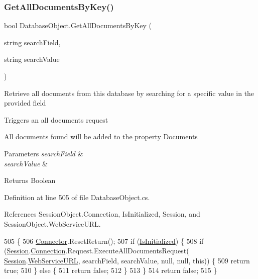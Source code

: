 \subsubsection{\texorpdfstring{Get\+All\+Documents\+By\+Key()}{GetAllDocumentsByKey()}}
{\footnotesize\ttfamily bool Database\+Object.\+Get\+All\+Documents\+By\+Key (\begin{DoxyParamCaption}\item[{string}]{search\+Field,  }\item[{string}]{search\+Value }\end{DoxyParamCaption})}



Retrieve all documents from this database by searching for a specific value in the provided field 

Triggers an all documents request

All documents found will be added to the property \textquotesingle{}Documents\textquotesingle{}


\begin{DoxyParams}{Parameters}
{\em search\+Field} & \\
\hline
{\em search\+Value} & \\
\hline
\end{DoxyParams}
\begin{DoxyReturn}{Returns}
Boolean
\end{DoxyReturn}


Definition at line 505 of file Database\+Object.\+cs.



References Session\+Object.\+Connection, Is\+Initialized, Session, and Session\+Object.\+Web\+Service\+U\+RL.


\begin{DoxyCode}
505                                                                              \{
506         \mbox{\hyperlink{class_connector}{Connector}}.ResetReturn();
507         \textcolor{keywordflow}{if} (\mbox{\hyperlink{class_database_object_a5fe036d32a30eb10d1b3f6a30263f740}{IsInitialized}}) \{
508             \textcolor{keywordflow}{if} (\mbox{\hyperlink{class_database_object_aa8484162b7d2a7c4c9426bca13c64c07}{Session}}.\mbox{\hyperlink{class_session_object_a014bdbf705a753540e19bfb53030c55c}{Connection}}.Request.ExecuteAllDocumentsRequest(
      \mbox{\hyperlink{class_database_object_aa8484162b7d2a7c4c9426bca13c64c07}{Session}}.\mbox{\hyperlink{class_session_object_a697c071c812fbf7ad1166b896fb44c16}{WebServiceURL}}, searchField, searchValue, null, null, \textcolor{keyword}{this})) \{
509                 \textcolor{keywordflow}{return} \textcolor{keyword}{true};
510             \} \textcolor{keywordflow}{else} \{
511                 \textcolor{keywordflow}{return} \textcolor{keyword}{false};
512             \}
513         \}
514         \textcolor{keywordflow}{return} \textcolor{keyword}{false};
515     \}
\end{DoxyCode}
\mbox{\label{class_database_object_a4d8a7d73614f53a04fe8eb79bef2f614}} 
